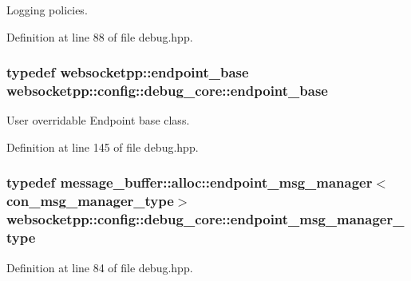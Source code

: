 Logging policies. 



Definition at line 88 of file debug.\+hpp.

\hypertarget{structwebsocketpp_1_1config_1_1debug__core_aeecf0530d869006ceab3aa4f5ee74663}{}
\subsubsection[{endpoint\+\_\+base}]{\setlength{\rightskip}{0pt plus 5cm}typedef {\bf websocketpp\+::endpoint\+\_\+base} {\bf websocketpp\+::config\+::debug\+\_\+core\+::endpoint\+\_\+base}}\label{structwebsocketpp_1_1config_1_1debug__core_aeecf0530d869006ceab3aa4f5ee74663}


User overridable Endpoint base class. 



Definition at line 145 of file debug.\+hpp.

\hypertarget{structwebsocketpp_1_1config_1_1debug__core_a02b1cc8ce11213011104049aeba57866}{}
\subsubsection[{endpoint\+\_\+msg\+\_\+manager\+\_\+type}]{\setlength{\rightskip}{0pt plus 5cm}typedef {\bf message\+\_\+buffer\+::alloc\+::endpoint\+\_\+msg\+\_\+manager}$<${\bf con\+\_\+msg\+\_\+manager\+\_\+type}$>$ {\bf websocketpp\+::config\+::debug\+\_\+core\+::endpoint\+\_\+msg\+\_\+manager\+\_\+type}}\label{structwebsocketpp_1_1config_1_1debug__core_a02b1cc8ce11213011104049aeba57866}


Definition at line 84 of file debug.\+hpp.

\hypertarget{structwebsocketpp_1_1config_1_1debug__core_ac17c81ad59c265eed87e3e25944c9fbf}{}
